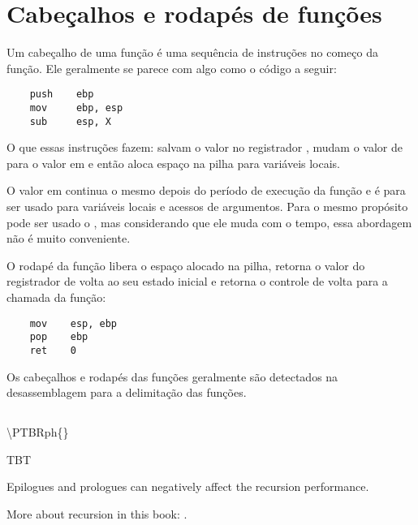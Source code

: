 \chapter{Cabeçalhos e rodapés de funções}
\label{sec:prologepilog}
\index{\PTBRph{}} %
\index{\PTBRph{}} %

Um cabeçalho de uma função é uma sequência de instruções no começo da função. Ele geralmente se parece com algo como o código a seguir:

\begin{lstlisting}
    push    ebp
    mov     ebp, esp
    sub     esp, X
\end{lstlisting}

O que essas instruções fazem: salvam o valor no registrador \EBP, mudam o valor de \EBP para o valor em \ESP e então aloca espaço na pilha para variáveis locais.

O valor em \EBP continua o mesmo depois do período de execução da função e é para ser usado para variáveis locais e acessos de argumentos.
Para o mesmo propósito pode ser usado o \ESP, mas considerando que ele muda com o tempo, essa abordagem não é muito conveniente.

O rodapé da função libera o espaço alocado na pilha, retorna o valor do registrador \EBP de volta ao seu estado inicial e retorna o controle de volta para a chamada da função:

\begin{lstlisting}
    mov    esp, ebp
    pop    ebp
    ret    0
\end{lstlisting}

Os cabeçalhos e rodapés das funções geralmente são detectados na desassemblagem para a delimitação das funções.

\ifx\LITE\undefined
\section{\Recursion}

\ac{\PTBRph{}}

\index{\Recursion}
\ac{TBT}

Epilogues and prologues can negatively affect the recursion performance.

More about recursion in this book: .
\fi %

